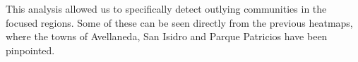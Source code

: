 This analysis allowed us to specifically detect outlying communities in the focused regions. Some of these can be seen directly from the previous heatmaps, where the towns of Avellaneda, San Isidro and Parque Patricios have been pinpointed.